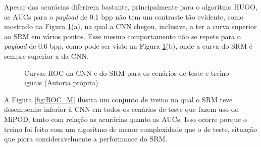 Apesar das acurácias diferirem bastante, principalmente para o algoritmo HUGO, as AUCs para o \textit{payload} de 0.1 bpp não tem um contraste tão evidente, como mostrado na Figura \ref{fig:ROC_H}(a), na qual a CNN chegou, inclusive, a ter a curva superior ao SRM em vários pontos. Esse mesmo comportamento não se repete para o \textit{payload} de 0.6 bpp, como pode ser visto na Figura \ref{fig:ROC_H}(b), onde a curva do SRM é sempre superior a da CNN.

\begin{figure}[!ht]
\centering
	\;
	\caption{Curvas ROC da CNN e do SRM para os cenários de teste e treino iguais (Autoria própria)}
    \label{fig:ROC_H}
\end{figure}

A Figura \ref{fig:ROC_M} ilustra um conjunto de treino no qual o SRM teve desempenho inferior à CNN em todos os cenários de teste que fazem uso do MiPOD, tanto com relação as acurácias quanto as AUCs. Isso ocorre porque o treino foi feito com um algoritmo de menor complexidade que o de teste, situação que piora consideravelmente a performance do SRM.

